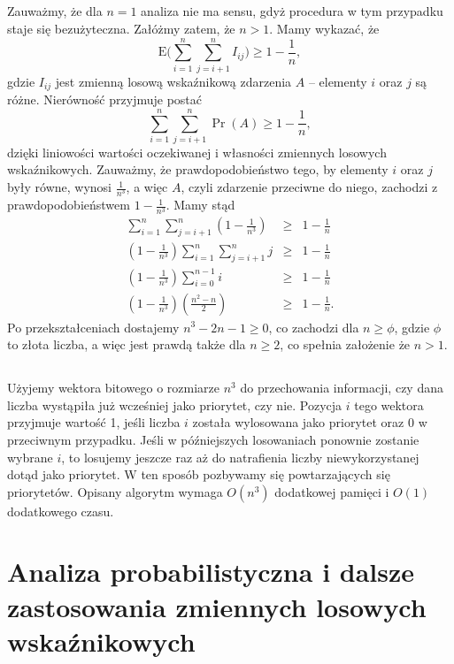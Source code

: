 \subsection{} %
Zauważmy, że dla $n=1$ analiza nie ma sensu, gdyż procedura  w tym przypadku staje się bezużyteczna. Załóżmy zatem, że $n>1$. Mamy wykazać, że
\[
	\mathrm{E}\biggl(\sum_{i=1}^n\sum_{j=i+1}^nI_{ij}\biggr) \ge 1-\frac{1}{n},
\]
gdzie $I_{ij}$ jest zmienną losową wskaźnikową zdarzenia $A$ -- elementy $i$ oraz $j$ są różne. Nierówność przyjmuje postać
\[
	\sum_{i=1}^n\sum_{j=i+1}^n\Pr(A) \ge 1-\frac{1}{n},
\]
dzięki liniowości wartości oczekiwanej i własności zmiennych losowych wskaźnikowych. Zauważmy, że prawdopodobieństwo tego, by elementy $i$ oraz $j$ były równe, wynosi $\frac{1}{n^3}$, a więc $A$, czyli zdarzenie przeciwne do niego, zachodzi z prawdopodobieństwem $1-\frac{1}{n^3}$. Mamy stąd
\begin{eqnarray*}
	\sum_{i=1}^n\sum_{j=i+1}^n\left(1-\frac{1}{n^3}\right) &\ge& 1-\frac{1}{n} \\
	\left(1-\frac{1}{n^3}\right)\sum_{i=1}^n\sum_{j=i+1}^nj &\ge& 1-\frac{1}{n} \\
	\left(1-\frac{1}{n^3}\right)\sum_{i=0}^{n-1}i &\ge& 1-\frac{1}{n} \\
	\left(1-\frac{1}{n^3}\right)\left(\frac{n^2-n}{2}\right) &\ge& 1-\frac{1}{n}.
\end{eqnarray*}
Po przekształceniach dostajemy $n^3-2n-1\ge0$, co zachodzi dla $n\ge\phi$, gdzie $\phi$ to złota liczba, a więc jest prawdą także dla $n\ge2$, co spełnia założenie że $n>1$.

\subsection{} %
Użyjemy wektora bitowego o rozmiarze $n^3$ do przechowania informacji, czy dana liczba wystąpiła już wcześniej jako priorytet, czy nie. Pozycja $i$ tego wektora przyjmuje wartość 1, jeśli liczba $i$ została wylosowana jako priorytet oraz $0$ w przeciwnym przypadku. Jeśli w późniejszych losowaniach ponownie zostanie wybrane $i$, to losujemy jeszcze raz aż do natrafienia liczby niewykorzystanej dotąd jako priorytet. W ten sposób pozbywamy się powtarzających się priorytetów. Opisany algorytm wymaga $O(n^3)$ dodatkowej pamięci i $O(1)$ dodatkowego czasu.

\section{Analiza probabilistyczna i dalsze zastosowania zmiennych losowych wskaźnikowych}


